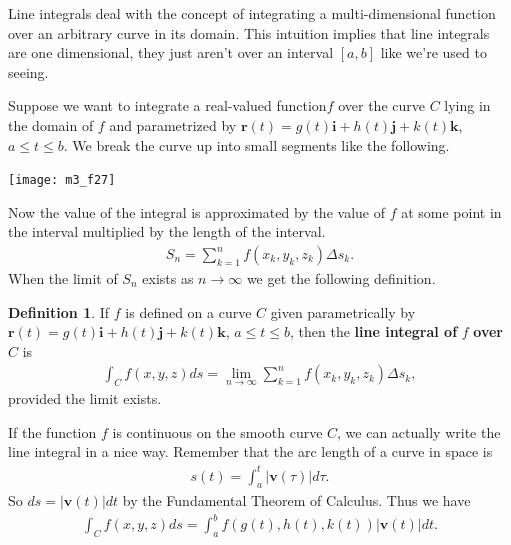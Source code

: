 \documentclass[12pt, letter]{article}
\theoremstyle{plain}
\numberwithin{theorem}{section}
\theoremstyle{definition}
\newtheorem{definition}[theorem]{Definition}
\begin{document}
Line integrals deal with the concept of integrating a multi-dimensional function over an arbitrary curve in its domain. This intuition implies that line integrals are one dimensional, they just aren't over an interval $[a,b]$ like we're used to seeing.

\bigskip

Suppose we want to integrate a real-valued function$f$ over the curve $C$ lying in the domain of $f$ and parametrized by $\bm{r}(t) = g(t) \bm{i} + h(t) \bm{j} + k(t) \bm{k}$, $a\leq t\leq b$. We break the curve up into small segments like the following.

\bigskip

\begin{center}
\texttt{[image: m3\_f27]}
\end{center}

\bigskip

Now the value of the integral is approximated by the value of $f$ at some point in the interval multiplied by the length of the interval.
\begin{align*}
S_n = \sum_{k=1}^n f(x_k,y_k,z_k)\Delta s_k.
\end{align*}
When the limit of $S_n$ exists as $n\to\infty$ we get the following definition.

\bigskip

\begin{definition}
If $f$ is defined on a curve $C$ given parametrically by $\bm{r}(t) = g(t)\bm{i}+h(t)\bm{j}+k(t)\bm{k}$, $a\leq t \leq b$, then the \textbf{line integral of} $f$ \textbf{over} $C$ is
\begin{align*}
\int_C f(x,y,z)ds = \lim_{n\to\infty} \sum_{k=1}^n f(x_k,y_k,z_k) \Delta s_k,
\end{align*}
provided the limit exists.
\end{definition}

\bigskip

\hrulefill

\bigskip

If the function $f$ is continuous on the smooth curve $C$, we can actually write the line integral in a nice way. Remember that the arc length of a curve in space is
\begin{align*}
s(t) = \int_a^t |\bm{v}(\tau)|d\tau.
\end{align*}
So $ds = |\bm{v}(t)|dt$ by the Fundamental Theorem of Calculus. Thus we have
\begin{align*}
\int_C f(x,y,z)ds = \int_a^b f(g(t),h(t),k(t)) |\bm{v}(t)|dt.
\end{align*}
\end{document}

